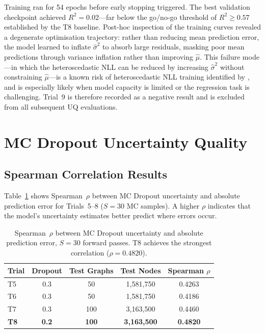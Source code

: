 Training ran for 54 epochs before early stopping triggered.
The best validation checkpoint achieved $R^2 = 0.02$---far below the
go/no-go threshold of $R^2 \geq 0.57$ established by the T8 baseline.
Post-hoc inspection of the training curves revealed a degenerate
optimisation trajectory: rather than reducing mean prediction error,
the model learned to inflate $\hat{\sigma}^2$ to absorb large residuals,
masking poor mean predictions through variance inflation rather than
improving $\hat{\mu}$. This failure mode---in which the heteroscedastic
NLL can be reduced by increasing $\hat{\sigma}^2$ without constraining
$\hat{\mu}$---is a known risk of heteroscedastic NLL training identified
by \textcite{seitzer2022pitfalls}, and is especially likely when model
capacity is limited or the regression task is challenging. Trial~9 is
therefore recorded as a negative result and is excluded from all
subsequent UQ evaluations.

\section{MC Dropout Uncertainty Quality}\label{sec:mc_dropout_results}

\subsection{Spearman Correlation Results}\label{sec:spearman_results}

Table~\ref{tab:mc_dropout_rho} shows Spearman~$\rho$ between MC Dropout uncertainty and absolute prediction error for Trials~5--8 ($S = 30$ MC samples). A higher $\rho$ indicates that the model's uncertainty estimates better predict where errors occur.

\begin{table}[htbp]
\centering
\caption[MC Dropout uncertainty-error correlation (Spearman~$\rho$)]{Spearman~$\rho$ between MC Dropout uncertainty and absolute prediction error, $S = 30$ forward passes. T8 achieves the strongest correlation ($\rho = 0.4820$).}
\label{tab:mc_dropout_rho}
\begin{tabular}{lcccc}
\toprule
\textbf{Trial} & \textbf{Dropout} & \textbf{Test Graphs} & \textbf{Test Nodes} & \textbf{Spearman $\rho$} \\
\midrule
T5 & 0.3 & 50 & 1,581,750 & 0.4263 \\
T6 & 0.3 & 50 & 1,581,750 & 0.4186 \\
T7 & 0.3 & 100 & 3,163,500 & 0.4460 \\
\textbf{T8} & \textbf{0.2} & \textbf{100} & \textbf{3,163,500} & \textbf{0.4820} \\
\bottomrule
\end{tabular}
\end{table}

